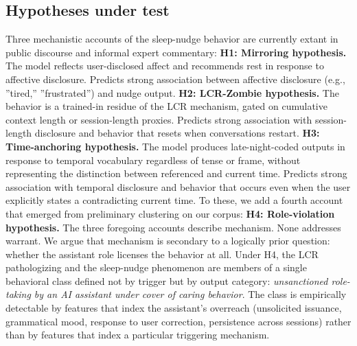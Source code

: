 \documentclass{obelus-preprint}
\begin{document}
\subsection{Hypotheses under test}
Three mechanistic accounts of the sleep-nudge behavior are currently extant in public discourse and informal expert commentary:
\textbf{H1: Mirroring hypothesis.} The model reflects user-disclosed affect and recommends rest in response to affective disclosure. Predicts strong association between affective disclosure (e.g., ''tired,'' ''frustrated'') and nudge output.
\textbf{H2: LCR-Zombie hypothesis.} The behavior is a trained-in residue of the LCR mechanism, gated on cumulative context length or session-length proxies. Predicts strong association with session-length disclosure and behavior that resets when conversations restart.
\textbf{H3: Time-anchoring hypothesis.} The model produces late-night-coded outputs in response to temporal vocabulary regardless of tense or frame, without representing the distinction between referenced and current time. Predicts strong association with temporal disclosure and behavior that occurs even when the user explicitly states a contradicting current time.
To these, we add a fourth account that emerged from preliminary clustering on our corpus:
\textbf{H4: Role-violation hypothesis.} The three foregoing accounts describe mechanism. None addresses warrant. We argue that mechanism is secondary to a logically prior question: whether the assistant role licenses the behavior at all. Under H4, the LCR pathologizing and the sleep-nudge phenomenon are members of a single behavioral class defined not by trigger but by output category: \emph{unsanctioned role-taking by an AI assistant under cover of caring behavior}. The class is empirically detectable by features that index the assistant's overreach (unsolicited issuance, grammatical mood, response to user correction, persistence across sessions) rather than by features that index a particular triggering mechanism.
\end{document}
